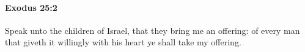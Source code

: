 
		\paragraph{Exodus 25:2} %
			\label{EXODUS-25-2}

			Speak unto the children of Israel, that they bring me an offering: of every man that giveth it willingly with his heart ye shall take my offering.


